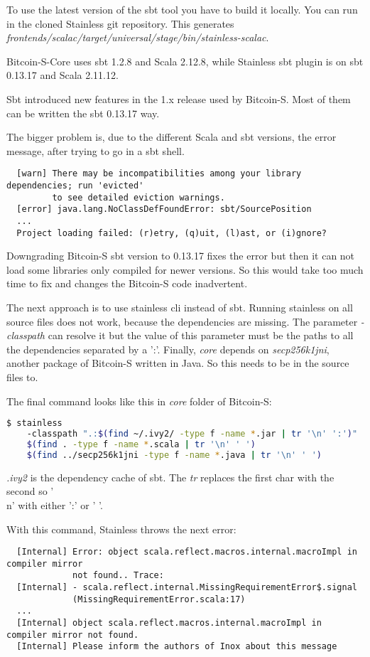 To use the latest version of the sbt tool you have to build it locally.
You can run  in the cloned Stainless git repository.
This generates \emph{frontends/scalac/target/universal/stage/bin/stainless-scalac}.

Bitcoin-S-Core uses sbt 1.2.8 and Scala 2.12.8, while Stainless sbt plugin is on sbt 0.13.17 and Scala 2.11.12.

Sbt introduced new features in the 1.x release used by Bitcoin-S.
Most of them can be written the sbt 0.13.17 way.

The bigger problem is, due to the different Scala and sbt versions, the error message, after trying to go in a sbt shell.
\begin{verbatim}
  [warn] There may be incompatibilities among your library dependencies; run 'evicted'
         to see detailed eviction warnings.
  [error] java.lang.NoClassDefFoundError: sbt/SourcePosition
  ...
  Project loading failed: (r)etry, (q)uit, (l)ast, or (i)gnore?
\end{verbatim}

Downgrading Bitcoin-S sbt version to 0.13.17 fixes the error but then it can not load some libraries only compiled for newer versions.
So this would take too much time to fix and changes the Bitcoin-S code inadvertent.

The next approach is to use stainless cli instead of sbt.
Running stainless on all source files does not work, because the dependencies are missing.
The parameter \emph{-classpath} can resolve it but the value of this parameter must be the paths to all the dependencies separated by a ':'.
Finally, \emph{core} depends on \emph{secp256k1jni}, another package of Bitcoin-S written in Java.
So this needs to be in the source files to.

The final command looks like this in \emph{core} folder of Bitcoin-S:
\begin{lstlisting}[language=bash]
  $ stainless
    -classpath ".:$(find ~/.ivy2/ -type f -name *.jar | tr '\n' ':')"
    $(find . -type f -name *.scala | tr '\n' ' ')
    $(find ../secp256k1jni -type f -name *.java | tr '\n' ' ')
\end{lstlisting}

\emph{.ivy2} is the dependency cache of sbt.
The \emph{tr} replaces the first char with the second so '\\n' with either ':' or ' '.

With this command, Stainless throws the next error:
\begin{verbatim}
  [Internal] Error: object scala.reflect.macros.internal.macroImpl in compiler mirror
             not found.. Trace:
  [Internal] - scala.reflect.internal.MissingRequirementError$.signal
             (MissingRequirementError.scala:17)
  ...
  [Internal] object scala.reflect.macros.internal.macroImpl in compiler mirror not found.
  [Internal] Please inform the authors of Inox about this message
\end{verbatim}

